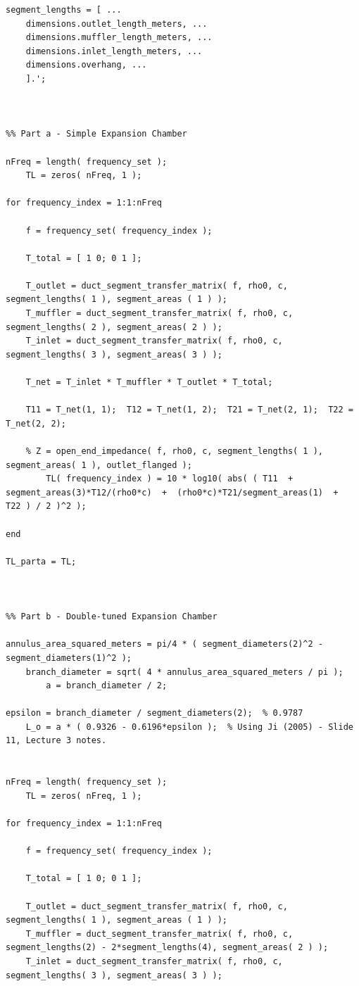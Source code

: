 \begin{lstlisting}[style=Matlab-editor, basicstyle=\fontfamily{pcr}, numbers=none, keepspaces, mlshowsectionrules, basicstyle=\footnotesize]
segment_lengths = [ ...
    dimensions.outlet_length_meters, ...
    dimensions.muffler_length_meters, ...
    dimensions.inlet_length_meters, ...
    dimensions.overhang, ...
    ].';



%% Part a - Simple Expansion Chamber

nFreq = length( frequency_set );
    TL = zeros( nFreq, 1 );

for frequency_index = 1:1:nFreq

    f = frequency_set( frequency_index );

    T_total = [ 1 0; 0 1 ];

    T_outlet = duct_segment_transfer_matrix( f, rho0, c, segment_lengths( 1 ), segment_areas ( 1 ) );
    T_muffler = duct_segment_transfer_matrix( f, rho0, c, segment_lengths( 2 ), segment_areas( 2 ) );
    T_inlet = duct_segment_transfer_matrix( f, rho0, c, segment_lengths( 3 ), segment_areas( 3 ) );

    T_net = T_inlet * T_muffler * T_outlet * T_total;

    T11 = T_net(1, 1);  T12 = T_net(1, 2);  T21 = T_net(2, 1);  T22 = T_net(2, 2);

    % Z = open_end_impedance( f, rho0, c, segment_lengths( 1 ), segment_areas( 1 ), outlet_flanged );
        TL( frequency_index ) = 10 * log10( abs( ( T11  +  segment_areas(3)*T12/(rho0*c)  +  (rho0*c)*T21/segment_areas(1)  +  T22 ) / 2 )^2 );

end

TL_parta = TL;



%% Part b - Double-tuned Expansion Chamber

annulus_area_squared_meters = pi/4 * ( segment_diameters(2)^2 - segment_diameters(1)^2 );
    branch_diameter = sqrt( 4 * annulus_area_squared_meters / pi );
        a = branch_diameter / 2;

epsilon = branch_diameter / segment_diameters(2);  % 0.9787
    L_o = a * ( 0.9326 - 0.6196*epsilon );  % Using Ji (2005) - Slide 11, Lecture 3 notes.


nFreq = length( frequency_set );
    TL = zeros( nFreq, 1 );

for frequency_index = 1:1:nFreq

    f = frequency_set( frequency_index );

    T_total = [ 1 0; 0 1 ];

    T_outlet = duct_segment_transfer_matrix( f, rho0, c, segment_lengths( 1 ), segment_areas ( 1 ) );
    T_muffler = duct_segment_transfer_matrix( f, rho0, c, segment_lengths(2) - 2*segment_lengths(4), segment_areas( 2 ) );
    T_inlet = duct_segment_transfer_matrix( f, rho0, c, segment_lengths( 3 ), segment_areas( 3 ) );


\end{lstlisting}
